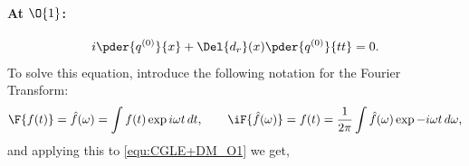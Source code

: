 \paragraph{At $\O{1}$:}
\begin{equation}\label{equ:CGLE+DM_O1}
\begin{split}
i \pder{q^{(0)}}{x} + \Del{d_r}(x)\pder{q^{(0)}}{tt}= 0 .\\
\end{split}
\end{equation} 
To solve this equation, introduce the following notation for the Fourier Transform:
\begin{equation}\label{equ:Fourier_Transform}
\begin{split}
\F{f(t)} = \hat{f}(\omega) = \int f(t) \exp{i\omega t}\,dt, \qquad \iF{\hat{f}(\omega)} = f(t) = \frac{1}{2\pi} \int \hat{f}(\omega) \exp{-i\omega t}\,d\omega,\\
\end{split}
\end{equation} 
and applying this to \eqref{equ:CGLE+DM_O1} we get,

